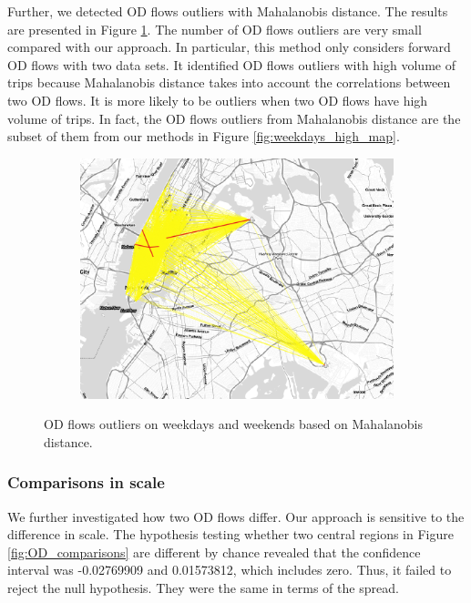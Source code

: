\documentclass[a4paper,UKenglish]{lipics-v2016}
\begin{document}
Further, we detected OD flows outliers with Mahalanobis distance. The results are presented in Figure \ref{fig:week_ends_MD}. The number of OD flows outliers are very small compared with our approach. In particular, this method only considers forward OD flows with two data sets. It identified OD flows outliers with high volume of trips  because Mahalanobis distance takes into account the correlations between two OD flows. It is more likely to be outliers when two OD flows have high volume of trips. In fact, the OD flows outliers from Mahalanobis distance are the subset of them from our methods in Figure \ref{fig:weekdays_high_map}. 

\begin{figure}
	\centering
	\begin{subfigure}[b]{0.49\textwidth}
		\includegraphics[width=\textwidth]{images/out_weekdays_weekends_md2_outlier.png}
	\end{subfigure}
	\caption{OD flows outliers on weekdays and weekends based on Mahalanobis distance. }\label{fig:week_ends_MD}	
\end{figure}

\subsubsection{Comparisons in scale}
We further investigated how two OD flows differ. Our approach is sensitive to the difference in scale. The hypothesis testing whether two central regions in Figure \ref{fig:OD_comparisons} are different by chance revealed that the confidence interval was -0.02769909 and 0.01573812, which includes zero. Thus, it failed to reject the null hypothesis. They were the same in terms of the spread.  
\end{document}
